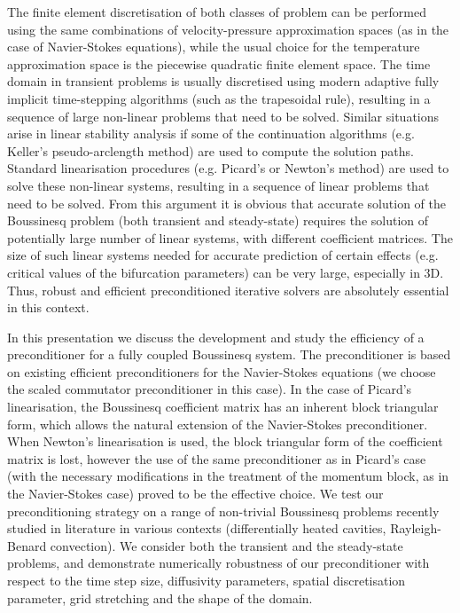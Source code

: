 \documentclass{report}
\begin{document}
The finite element discretisation of both classes of problem can be
performed using the same combinations of velocity-pressure approximation
spaces (as in the case of Navier-Stokes equations), while the usual
choice for the temperature
approximation space is the piecewise quadratic finite element space. The
time domain in transient problems is usually discretised using modern
adaptive fully implicit time-stepping algorithms (such as the trapesoidal
rule), resulting in a
sequence of large non-linear problems that need to be solved. Similar
situations arise in linear stability analysis if some of the continuation
algorithms (e.g. Keller's pseudo-arclength method) are used to compute
the solution paths. Standard linearisation procedures (e.g. Picard's or
Newton's method) are used to solve these non-linear systems, resulting in
a sequence of linear problems that need to be solved. From this argument
it is obvious that accurate solution of the Boussinesq problem (both
transient and steady-state) requires the solution of potentially large
number of linear systems, with different coefficient matrices. The size
of such linear systems needed for
accurate prediction of certain effects (e.g. critical values of the
bifurcation parameters) can be very large, especially in 3D. Thus, robust
and efficient preconditioned iterative solvers are absolutely essential
in this context.

In this presentation we discuss the development and study the efficiency
of a preconditioner for a fully coupled Boussinesq system. The
preconditioner is based on existing efficient preconditioners for the
Navier-Stokes equations (we
choose the scaled commutator preconditioner in this case). In the case of
Picard's linearisation, the Boussinesq coefficient matrix has an inherent
block triangular form, which allows the natural extension of the
Navier-Stokes preconditioner. When Newton's linearisation is used, the
block triangular form
of the coefficient matrix is lost, however the use of the same
preconditioner as in Picard's case (with the necessary modifications in
the treatment of the momentum block, as in the Navier-Stokes case) proved
to be the effective choice.
We test our preconditioning strategy on a range of non-trivial Boussinesq
problems recently studied in literature in various contexts
(differentially heated cavities, Rayleigh-Benard convection). We consider
both the transient and the steady-state problems, and demonstrate
numerically robustness of our
preconditioner with respect to the time step size, diffusivity
parameters, spatial discretisation parameter, grid stretching and the
shape of the domain.
\end{document}
